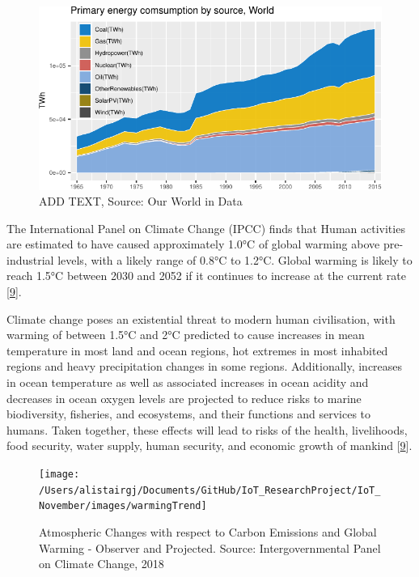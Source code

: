 \documentclass[11pt,]{article}
\begin{document}
\begin{figure}[H]

{\centering \includegraphics{MD_Final_files/figure-latex/globalEnergyPlot-1} 

}

\caption{ADD TEXT, Source: Our World in Data}\label{fig:globalEnergyPlot}
\end{figure}

The International Panel on Climate Change (IPCC) finds that Human
activities are estimated to have caused approximately 1.0°C of global
warming above pre-industrial levels, with a likely range of 0.8°C to
1.2°C. Global warming is likely to reach 1.5°C between 2030 and 2052 if
it continues to increase at the current rate
{[}\protect\hyperlink{ref-intergovernmentalpanelonclimatechangeGlobalWarming2018}{9}{]}.

Climate change poses an existential threat to modern human civilisation,
with warming of between 1.5°C and 2°C predicted to cause increases in
mean temperature in most land and ocean regions, hot extremes in most
inhabited regions and heavy precipitation changes in some regions.
Additionally, increases in ocean temperature as well as associated
increases in ocean acidity and decreases in ocean oxygen levels are
projected to reduce risks to marine biodiversity, fisheries, and
ecosystems, and their functions and services to humans. Taken together,
these effects will lead to risks of the health, livelihoods, food
security, water supply, human security, and economic growth of mankind
{[}\protect\hyperlink{ref-intergovernmentalpanelonclimatechangeGlobalWarming2018}{9}{]}.

\begin{figure}[H]

{\centering \texttt{[image: /Users/alistairgj/Documents/GitHub/IoT\_ResearchProject/IoT\_November/images/warmingTrend]} 

}

\caption{Atmospheric Changes with respect to Carbon Emissions and Global Warming - Observer and Projected. Source: Intergovernmental Panel on Climate Change, 2018}\label{fig:warmingTrend}
\end{figure}
\end{document}
